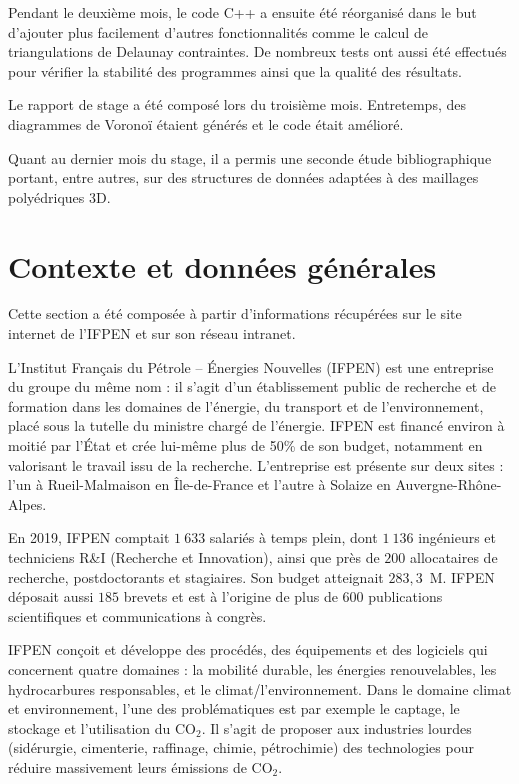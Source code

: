 \documentclass[12pt,a4paper]{report}
\begin{document}
Pendant le deuxième mois, le code C++ a ensuite été réorganisé dans le but d'ajouter plus facilement d'autres fonctionnalités comme le calcul de triangulations de Delaunay contraintes. De nombreux tests ont aussi été effectués pour vérifier la stabilité des programmes ainsi que la qualité des résultats.

Le rapport de stage a été composé lors du troisième mois. Entretemps, des diagrammes de Voronoï étaient générés et le code était amélioré.

Quant au dernier mois du stage, il a permis une seconde étude bibliographique portant, entre autres, sur des structures de données adaptées à des maillages polyédriques 3D.

\newpage
\section{Contexte et données générales}
Cette section a été composée à partir d'informations récupérées sur le site internet de l'IFPEN et sur son réseau intranet.
\vspace{1cm}

L'Institut Français du Pétrole -- \'Energies Nouvelles (IFPEN) est une entreprise du groupe du même nom : il s'agit d'un établissement public de recherche et de formation dans les domaines de l'énergie, du transport et de l'environnement, placé sous la tutelle du ministre chargé de l'énergie. IFPEN est financé environ à moitié par l'\'Etat et crée lui-même plus de 50\% de son budget, notamment en valorisant le travail issu de la recherche. L'entreprise est présente sur deux sites : l'un à Rueil-Malmaison en \^Ile-de-France et l'autre à Solaize en Auvergne-Rhône-Alpes.

En 2019, IFPEN comptait $1\ 633$ salariés à temps plein, dont $1\ 136$ ingénieurs et techniciens R\&I (Recherche et Innovation), ainsi que près de $200$ allocataires de recherche, postdoctorants et stagiaires. Son budget atteignait $283,3$~\textrm{M}\texteuro. IFPEN déposait aussi $185$ brevets et est à l'origine de plus de $600$ publications scientifiques et communications à congrès.

IFPEN conçoit et développe des procédés, des équipements et des logiciels qui concernent quatre domaines : la mobilité durable, les énergies renouvelables, les hydrocarbures responsables, et le climat/l'environnement. Dans le domaine climat et environnement, l'une des problématiques est par exemple le captage, le stockage et l'utilisation du CO$_2$. Il s'agit de proposer aux industries lourdes (sidérurgie, cimenterie, raffinage, chimie, pétrochimie) des technologies pour réduire massivement leurs émissions de CO$_2$.
\end{document}
